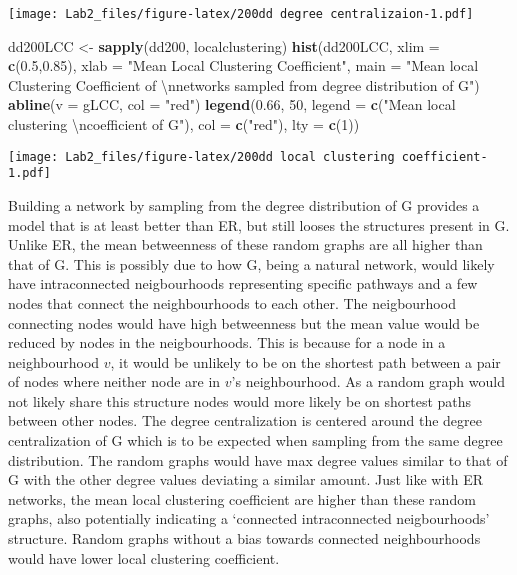 \documentclass[]{article}
\newenvironment{Shaded}{\begin{snugshade}}{\end{snugshade}}
\newcommand{\KeywordTok}[1]{\textcolor[rgb]{0.13,0.29,0.53}{\textbf{#1}}}
\newcommand{\DataTypeTok}[1]{\textcolor[rgb]{0.13,0.29,0.53}{#1}}
\newcommand{\DecValTok}[1]{\textcolor[rgb]{0.00,0.00,0.81}{#1}}
\newcommand{\FloatTok}[1]{\textcolor[rgb]{0.00,0.00,0.81}{#1}}
\newcommand{\CharTok}[1]{\textcolor[rgb]{0.31,0.60,0.02}{#1}}
\newcommand{\StringTok}[1]{\textcolor[rgb]{0.31,0.60,0.02}{#1}}
\newcommand{\NormalTok}[1]{#1}
\begin{document}
\texttt{[image: Lab2\_files/figure-latex/200dd degree centralizaion-1.pdf]}

\begin{Shaded}
\begin{Highlighting}[]
\NormalTok{dd200LCC <-}\StringTok{ }\KeywordTok{sapply}\NormalTok{(dd200, localclustering)}
\KeywordTok{hist}\NormalTok{(dd200LCC, }\DataTypeTok{xlim =} \KeywordTok{c}\NormalTok{(}\FloatTok{0.5}\NormalTok{,}\FloatTok{0.85}\NormalTok{), }\DataTypeTok{xlab =} \StringTok{"Mean Local Clustering Coefficient"}\NormalTok{,}
     \DataTypeTok{main =} \StringTok{"Mean local Clustering Coefficient of }\CharTok{\textbackslash{}n}\StringTok{networks sampled from degree distribution of G"}\NormalTok{)}
\KeywordTok{abline}\NormalTok{(}\DataTypeTok{v =}\NormalTok{ gLCC, }\DataTypeTok{col =} \StringTok{"red"}\NormalTok{)}
\KeywordTok{legend}\NormalTok{(}\FloatTok{0.66}\NormalTok{, }\DecValTok{50}\NormalTok{, }\DataTypeTok{legend =} \KeywordTok{c}\NormalTok{(}\StringTok{"Mean local clustering }\CharTok{\textbackslash{}n}\StringTok{coefficient of G"}\NormalTok{), }\DataTypeTok{col =} \KeywordTok{c}\NormalTok{(}\StringTok{"red"}\NormalTok{), }\DataTypeTok{lty =} \KeywordTok{c}\NormalTok{(}\DecValTok{1}\NormalTok{))}
\end{Highlighting}
\end{Shaded}

\texttt{[image: Lab2\_files/figure-latex/200dd local clustering coefficient-1.pdf]}

Building a network by sampling from the degree distribution of G
provides a model that is at least better than ER, but still looses the
structures present in G. Unlike ER, the mean betweenness of these random
graphs are all higher than that of G. This is possibly due to how G,
being a natural network, would likely have intraconnected neigbourhoods
representing specific pathways and a few nodes that connect the
neighbourhoods to each other. The neigbourhood connecting nodes would
have high betweenness but the mean value would be reduced by nodes in
the neigbourhoods. This is because for a node in a neighbourhood \(v\),
it would be unlikely to be on the shortest path between a pair of nodes
where neither node are in \(v\)'s neighbourhood. As a random graph would
not likely share this structure nodes would more likely be on shortest
paths between other nodes. The degree centralization is centered around
the degree centralization of G which is to be expected when sampling
from the same degree distribution. The random graphs would have max
degree values similar to that of G with the other degree values
deviating a similar amount. Just like with ER networks, the mean local
clustering coefficient are higher than these random graphs, also
potentially indicating a `connected intraconnected neigbourhoods'
structure. Random graphs without a bias towards connected neighbourhoods
would have lower local clustering coefficient.
\end{document}
